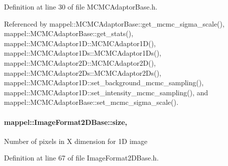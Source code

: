 Definition at line 30 of file M\+C\+M\+C\+Adaptor\+Base.\+h.



Referenced by mappel\+::\+M\+C\+M\+C\+Adaptor\+Base\+::get\+\_\+mcmc\+\_\+sigma\+\_\+scale(), mappel\+::\+M\+C\+M\+C\+Adaptor\+Base\+::get\+\_\+stats(), mappel\+::\+M\+C\+M\+C\+Adaptor1\+D\+::\+M\+C\+M\+C\+Adaptor1\+D(), mappel\+::\+M\+C\+M\+C\+Adaptor1\+Ds\+::\+M\+C\+M\+C\+Adaptor1\+Ds(), mappel\+::\+M\+C\+M\+C\+Adaptor2\+D\+::\+M\+C\+M\+C\+Adaptor2\+D(), mappel\+::\+M\+C\+M\+C\+Adaptor2\+Ds\+::\+M\+C\+M\+C\+Adaptor2\+Ds(), mappel\+::\+M\+C\+M\+C\+Adaptor1\+D\+::set\+\_\+background\+\_\+mcmc\+\_\+sampling(), mappel\+::\+M\+C\+M\+C\+Adaptor1\+D\+::set\+\_\+intensity\+\_\+mcmc\+\_\+sampling(), and mappel\+::\+M\+C\+M\+C\+Adaptor\+Base\+::set\+\_\+mcmc\+\_\+sigma\+\_\+scale().

\paragraph[{\texorpdfstring{size}{size}}]{ mappel\+::\+Image\+Format2\+D\+Base\+::size\hspace{0.3cm}{\ttfamily [protected]}, {\ttfamily [inherited]}}\hypertarget{classmappel_1_1ImageFormat2DBase_a3be77d2aa6ec9f3815322732950c2a60}{}\label{classmappel_1_1ImageFormat2DBase_a3be77d2aa6ec9f3815322732950c2a60}
Number of pixels in X dimension for 1D image 

Definition at line 67 of file Image\+Format2\+D\+Base.\+h.



